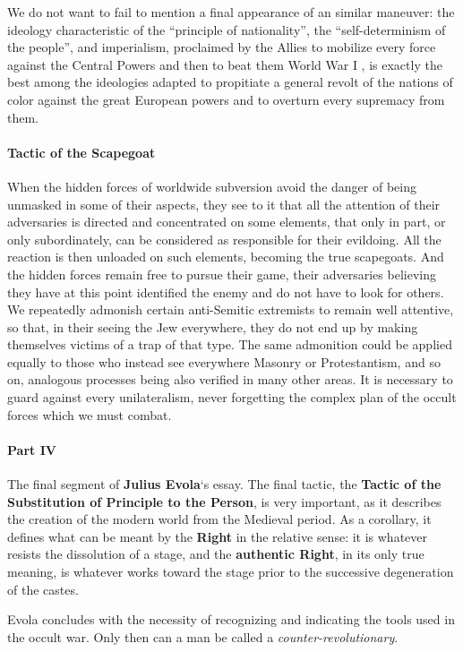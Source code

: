 We do not want to fail to mention a final appearance of an similar maneuver: the ideology characteristic of the ``principle of nationality'', the ``self-determinism of the people'', and imperialism, proclaimed by the Allies to mobilize every force against the Central Powers and then to beat them World War I , is exactly the best among the ideologies adapted to propitiate a general revolt of the nations of color against the great European powers and to overturn every supremacy from them.

\paragraph{Tactic of the Scapegoat}


When the hidden forces of worldwide subversion avoid the danger of being unmasked in some of their aspects, they see to it that all the attention of their adversaries is directed and concentrated on some elements, that only in part, or only subordinately, can be considered as responsible for their evildoing. All the reaction is then unloaded on such elements, becoming the true scapegoats. And the hidden forces remain free to pursue their game, their adversaries believing they have at this point identified the enemy and do not have to look for others. We repeatedly admonish certain anti-Semitic extremists to remain well attentive, so that, in their seeing the Jew everywhere, they do not end up by making themselves victims of a trap of that type. The same admonition could be applied equally to those who instead see everywhere Masonry or Protestantism, and so on, analogous processes being also verified in many other areas. It is necessary to guard against every unilateralism, never forgetting the complex plan of the occult forces which we must combat.

\paragraph{Part IV}

\begin{quotationx}
The final segment of \textbf{Julius Evola}`s essay. The final tactic, the \textbf{Tactic of the Substitution of Principle to the Person}, is very important, as it describes the creation of the modern world from the Medieval period. As a corollary, it defines what can be meant by the \textbf{Right} in the relative sense: it is whatever resists the dissolution of a stage, and the \textbf{authentic Right}, in its only true meaning, is whatever works toward the stage prior to the successive degeneration of the castes.

Evola concludes with the necessity of recognizing and indicating the tools used in the occult war. Only then can a man be called a \emph{counter-revolutionary}.
\end{quotationx}


